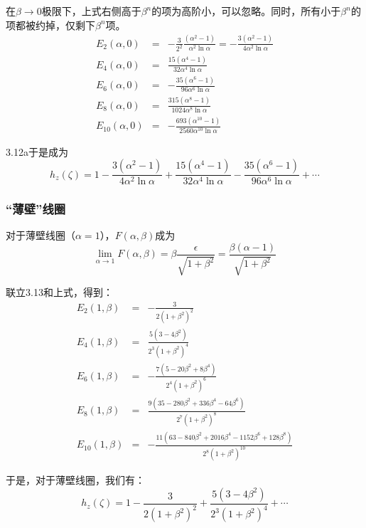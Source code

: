 在$\beta\rightarrow 0$极限下，上式右侧高于$\beta^n$的项为高阶小，可以忽略。同时，所有小于$\beta^n$的项都被约掉，仅剩下$\beta^n$项。
\begin{eqnarray}
  E_2(\alpha,0) &=& -\frac{3}{2^2}\frac{(\alpha^2-1)}{\alpha^2 \ln \alpha}=-\frac{3(\alpha^2-1)}{4\alpha^2 \ln \alpha} \\ \nonumber
  E_4(\alpha,0) &=& \frac{15(\alpha^4-1)}{32\alpha^4 \ln \alpha} \\ \nonumber
  E_6(\alpha,0) &=& -\frac{35(\alpha^6-1)}{96\alpha^6\ln \alpha} \\ \nonumber
  E_8(\alpha,0) &=& \frac{315(\alpha^8-1)}{1024\alpha^8 \ln \alpha} \\ \nonumber
    E_{10}(\alpha,0) &=& -\frac{693(\alpha^{10}-1)}{2560\alpha^{10} \ln \alpha}
\end{eqnarray}

3.12a于是成为
\begin{equation}
  h_z(\zeta)=1-\frac{3(\alpha^2-1)}{4\alpha^2 \ln \alpha}+\frac{15(\alpha^4-1)}{32\alpha^4 \ln \alpha} -\frac{35(\alpha^6-1)}{96\alpha^6\ln \alpha}+\cdots
\end{equation}

\subsubsection{“薄壁”线圈}
对于薄壁线圈（$\alpha=1$），$F(\alpha,\beta)$成为
\begin{equation}
  \lim_{\alpha\rightarrow 1} F(\alpha,\beta)=\beta\frac{\epsilon}{\sqrt{1+\beta^2}}=\frac{\beta(\alpha-1)}{\sqrt{1+\beta^2}}
\end{equation}

联立3.13和上式，得到：
\begin{eqnarray}
  E_2(1,\beta) &=& -\frac{3}{2(1+\beta^2)^2} \\ \nonumber
  E_4(1,\beta) &=& \frac{5(3-4\beta^2)}{2^3(1+\beta^2)^4} \\ \nonumber
    E_6(1,\beta) &=& -\frac{7(5-20\beta^2+8\beta^4)}{2^4 (1+\beta^2)^6} \\ \nonumber
      E_8(1,\beta) &=& \frac{9(35-280\beta^2+336\beta^4-64\beta^6)}{2^7(1+\beta^2)^8} \\ \nonumber
        E_{10}(1,\beta) &=& -\frac{11(63-840\beta^2+2016\beta^4-1152\beta^6+128\beta^8)}{2^8(1+\beta^2)^{10}}
\end{eqnarray}

于是，对于薄壁线圈，我们有：
\begin{equation}
  h_z(\zeta)=1-\frac{3}{2(1+\beta^2)^2} +\frac{5(3-4\beta^2)}{2^3(1+\beta^2)^4}+\cdots
\end{equation}

